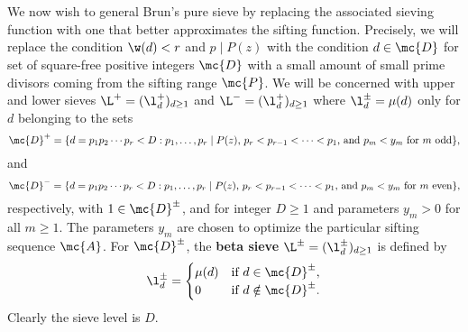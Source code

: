   \section{}
    We now wish to general Brun's pure sieve by replacing the associated sieving function with one that better approximates the sifting function. Precisely, we will replace the condition $\w(d) < r$ and $p \mid P(z)$ with the condition $d \in \mc{D}$ for set of square-free positive integers $\mc{D}$ with a small amount of small prime divisors coming from the sifting range $\mc{P}$. We will be concerned with upper and lower sieves $\L^{+} = (\l_{d}^{+})_{d \ge 1}$ and $\L^{-} = (\l_{d}^{+})_{d \ge 1}$ where $\l_{d}^{\pm} = \mu(d)$ only for $d$ belonging to the sets
    \[
      \mc{D}^{+} = \{d = p_{1}p_{2} \cdots p_{r} < D:\text{$p_{1},\ldots,p_{r} \mid P(z)$, $p_{r} < p_{r-1} < \cdots < p_{1}$, and $p_{m} < y_{m}$ for $m$ odd}\},
    \]
    and
    \[
      \mc{D}^{-} = \{d = p_{1}p_{2} \cdots p_{r} < D:\text{$p_{1},\ldots,p_{r} \mid P(z)$, $p_{r} < p_{r-1} < \cdots < p_{1}$, and $p_{m} < y_{m}$ for $m$ even}\},
    \]
    respectively, with $1 \in \mc{D}^{\pm}$, and for integer $D \ge 1$ and parameters $y_{m} > 0$ for all $m \ge 1$. The parameters $y_{m}$ are chosen to optimize the particular sifting sequence $\mc{A}$. For $\mc{D}^{\pm}$, the \textbf{beta sieve} $\L^{\pm} = (\l_{d}^{\pm})_{d \ge 1}$ is defined by
    \[
      \l_{d}^{\pm} = \begin{cases} \mu(d) & \text{if $d \in \mc{D}^{\pm}$}, \\ 0 & \text{if $d \notin \mc{D}^{\pm}$}. \end{cases}
    \]
    Clearly the sieve level is $D$. 
    
    \iffalse For a fixed $z$, index the sifting primes diving $P(z)$ as $q_{1} > q_{2} > \cdots > q_{m}$. Then we define the parameters $y_{m}$ by
    \[
      y_{m} = \left(\frac{D}{q_{1}q_{2} \cdots q_{m}}\right)^{\frac{1}{\b}},
    \]
    for some $\b \ge 1$. Thus if $d = p_{1}p_{2} \cdots p_{r} \in \mc{D}^{\pm}$ we have that $r \le m$. Moreover, $q_{1}\cdots q_{m}p_{m}^{\b} < D$ for $m$ odd or $m$ even depending on if $d \in \mc{D}^{+}$ or $d \in \mc{D}^{-}$ respectively.
    \fi
  \section{}
  \section{}